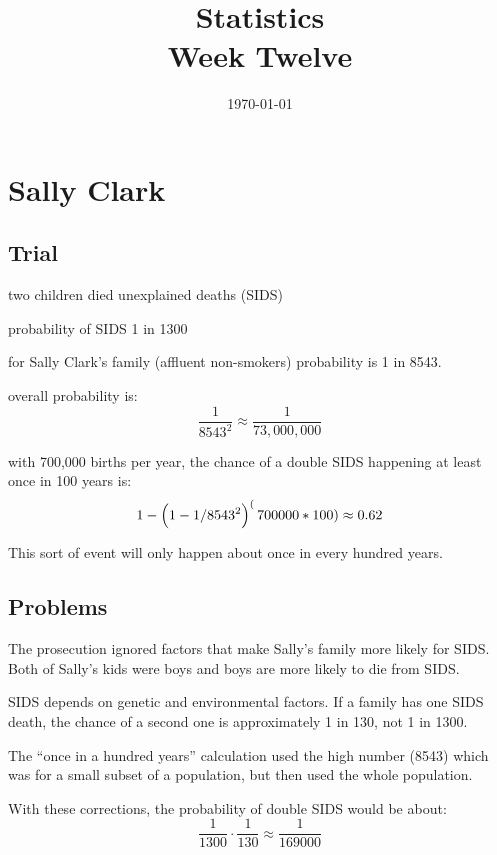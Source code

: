 \documentclass[letterpaper, landscape]{exam}
\title{Statistics \\ Week Twelve}
\date{\today}
\author{}
\begin{document}
  \maketitle
  \tableofcontents

  \section{Sally Clark}

  \subsection{Trial}
  \begin{itemize*}
    \item two children died unexplained deaths (SIDS)
    \item probability of SIDS 1 in 1300
    \item for Sally Clark's family (affluent non-smokers) probability is 1 in
      8543.
    \item overall probability is:
      \[
        \frac{1}{8543^2} \approx \frac{1}{73,000,000}
      \]

    \item with 700,000 births per year, the chance of a double SIDS happening at
      least once in 100 years is:
      \[
        1 - \del{ 1 - 1/8543^2 }^(700000 * 100) \approx 0.62
      \]

      This sort of event will only happen about once in every hundred years.
  \end{itemize*}

  \subsection{Problems}

  The prosecution ignored factors that make Sally's family more likely for
  SIDS\@. Both of Sally's kids were boys and boys are more likely to die from
  SIDS\@.

  SIDS depends on genetic and environmental factors. If a family has one SIDS
  death, the chance of a second one is approximately 1 in 130, not 1 in 1300.

  The ``once in a hundred years'' calculation used the high number (8543)
  which was for a small subset of a population, but then used the whole
  population.

  With these corrections, the probability of double SIDS would be about:
  \[
    \frac{1}{1300} \cdot \frac{1}{130} \approx \frac{1}{169000} 
  \]
\end{document}
